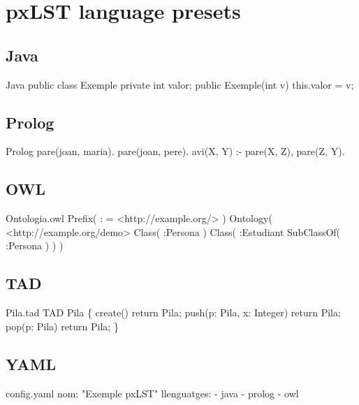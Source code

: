 \documentclass{P3CTeX}
\begin{document}
\section*{pxLST language presets}


\subsection*{Java}
\begin{pxCode}[language=pxJava]{Java}
public class Exemple {
  private int valor;
  public Exemple(int v) { this.valor = v; }
}
\end{pxCode}

\subsection*{Prolog}
\begin{pxCode}[language=pxProlog]{Prolog}
pare(joan, maria).
pare(joan, pere).
avi(X, Y) :- pare(X, Z), pare(Z, Y).
\end{pxCode}

\subsection*{OWL}
\begin{pxCode}[language=pxOWL]{Ontologia.owl}
Prefix( : = <http://example.org/> )
Ontology( <http://example.org/demo>
  Class( :Persona )
  Class( :Estudiant SubClassOf( :Persona ) )
)
\end{pxCode}

\subsection*{TAD}
\begin{pxCode}[language=pxTAD]{Pila.tad}
TAD Pila \{
  create() return Pila;
  push(p: Pila, x: Integer) return Pila;
  pop(p: Pila) return Pila;
\}
\end{pxCode}

\subsection*{YAML}
\begin{pxCode}[language=pxYAML]{config.yaml}
nom: "Exemple pxLST"
llenguatges:
  - java
  - prolog
  - owl
\end{pxCode}
\end{document}
